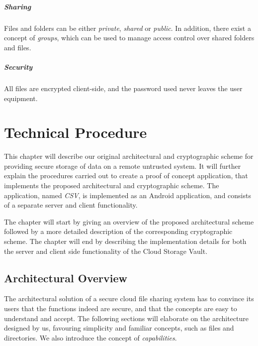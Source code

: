 \documentclass[pdftex,english,10pt,b5paper,twoside]{book}
\begin{document}
\paragraph{Sharing} Files and folders can be either \emph{private},
\emph{shared} or \emph{public}. In addition, there exist a concept of
\emph{groups}, which can be used to manage access control over shared folders
and files.

\paragraph{Security} All files are encrypted client-side, and the password used
never leaves the user equipment.


\chapter{Technical Procedure}
\label{ch:technical}


This chapter will describe our original architectural and cryptographic
scheme for providing secure storage of data on a remote untrusted system. It will
further explain the procedures carried out to create a proof of concept
application, that implements the proposed architectural and cryptographic
scheme. The application, named \emph{\ac{CSV}}, is implemented as an
Android application, and consists of a separate server and client functionality.

The chapter will start by giving an overview of the proposed architectural
scheme followed by a more detailed description of the corresponding
cryptographic scheme. The chapter will end by describing the implementation
details for both the server and client side functionality of the Cloud Storage Vault.

\section{Architectural Overview}
\label{chap:AS}

The architectural solution of a secure cloud file sharing system has to
convince its users that the functions indeed are secure, and that the concepts
are easy to understand and accept. The following sections will elaborate on the
architecture designed by us, favouring simplicity and familiar concepts, such
as files and directories. We also introduce the concept of \emph{capabilities}.
\end{document}
